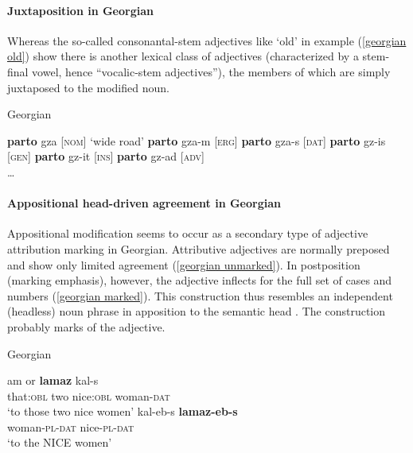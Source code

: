\paragraph*{Juxtaposition in Georgian}
Whereas the so-called consonantal-stem adjectives like ‘old’ in example (\ref{georgian old}) show  there is another lexical class of adjectives (characterized by a stem-final vowel, hence “vocalic-stem adjectives”), the members of which are simply juxtaposed to the modified noun.
\begin{exe}
\ex \rm{Georgian \citep[236]{aronson1991}}
\begin{xlist}
\ex \textbf{parto} gza	\rm[{\textsc{nom}] ‘wide road’}
\ex \textbf{parto} gza-m	\rm[{\textsc{erg}]}
\ex \textbf{parto} gza-s	\rm[{\textsc{dat}]}
\ex \textbf{parto} gz-is	\rm[{\textsc{gen}]}
\ex \textbf{parto} gz-it	\rm[{\textsc{ins}]}
\ex \textbf{parto} gz-ad	\rm[{\textsc{adv}]}\\
\dots
\end{xlist}
\end{exe}

\paragraph*{Appositional head\hyp{}driven agreement in Georgian}
Appositional modification seems to occur as a secondary type of adjective attribution marking in Georgian. Attributive adjectives are normally preposed and show only limited agreement (\ref{georgian unmarked}). In postposition (marking emphasis), however, the adjective inflects for the full set of cases and numbers (\ref{georgian marked}). This construction thus resembles an independent (headless) noun phrase in apposition to the semantic head \citep[652, 677]{testelec1998}. The construction probably marks  of the adjective.
\begin{exe}
\ex \rm{Georgian \citep[652]{testelec1998}}
\begin{xlist}
\label{georgian unmarked}
\ex 
\gll	am or \textbf{lamaz} kal-s\\
	that:\textsc{obl} two nice:\textsc{obl} woman-\textsc{dat}\\
\glt	‘to those two nice women’
\label{georgian marked}
\ex 
\gll	kal-eb-s \textbf{lamaz-eb-s}\\
	woman-\textsc{pl}-\textsc{dat} nice-\textsc{pl}-\textsc{dat}\\
\glt	‘to the NICE women’
\end{xlist}
\end{exe}

